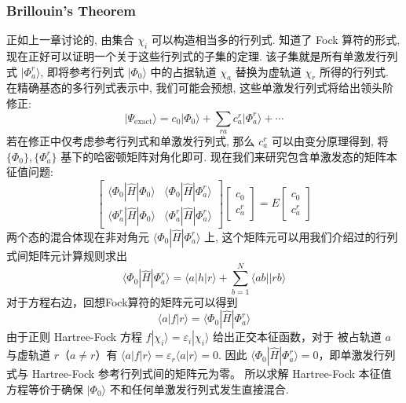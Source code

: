 \documentclass[fontset=none,12pt,a4paper]{ctexart}
\numberwithin{equation}{section}
\begin{document}
\subsubsection{Brillouin's Theorem}
正如上一章讨论的, 由集合 ${\chi_i}$ 可以构造相当多的行列式. 知道了 Fock 算符的形式,
现在正好可以证明一个关于这些行列式的子集的定理. 该子集就是所有单激发行列式
$|\Phi_a^r\rangle$, 即将参考行列式 $|\Phi_0\rangle$ 中的占据轨道 $\chi_a$
替换为虚轨道 $\chi_r$ 所得的行列式. 在精确基态的多行列式表示中, 我们可能会预想,
这些单激发行列式将给出领头阶修正:
\begin{equation}
  |\Psi_{\mathrm{exact}}\rangle
  =c_0|\Phi_0\rangle+\sum_{ra}c_a^r|\Phi_a^r\rangle+\cdots
\end{equation}
若在修正中仅考虑参考行列式和单激发行列式, 那么 $c_a^r$ 可以由变分原理得到,
将 $\{\Phi_0\}, \{\Phi_a^r\}$ 基下的哈密顿矩阵对角化即可. 现在我们来研究包含单激发态的矩阵本征值问题:
\begin{equation}
  \begin{bmatrix}
    \langle\Phi_0|\hat{H}|\Phi_0\rangle & \langle\Phi_0|\hat{H}|\Phi_a^r\rangle \\
    \langle\Phi_a^r|\hat{H}|\Phi_0\rangle & \langle\Phi_a^r|\hat{H}|\Phi_a^r\rangle
  \end{bmatrix}  \begin{bmatrix}
    c_0 \\ c_a^r
  \end{bmatrix}
  =E
  \begin{bmatrix}
    c_0 \\ c_a^r
  \end{bmatrix}
  \label{eq:smatrix}
\end{equation}
两个态的混合体现在非对角元 $\langle\Phi_0|\hat{H}|\Phi_a^r\rangle$ 上, 这个矩阵元可以用我们介绍过的行列式间矩阵元计算规则求出
\begin{equation}
  \langle\Phi_0|\hat{H}|\Phi_a^r\rangle
  =\langle a|h|r\rangle+\sum_{b=1}^N\langle ab||rb\rangle
\end{equation}
对于方程右边，回想Fock算符的矩阵元可以得到
\begin{equation}
  \langle a|f|r\rangle=\langle\Phi_0|\hat{H}|\Phi_a^r\rangle
\end{equation}
由于正则 Hartree-Fock 方程 $f|\chi_i\rangle=\varepsilon_i|\chi_i\rangle$ 给出正交本征函数，对于
被占轨道 $a$ 与虚轨道 $r$（$a\neq r$）有 $\langle a|f|r\rangle = \varepsilon_r\langle a|r\rangle = 0$.
因此 $\langle\Phi_0|\hat{H}|\Phi_a^r\rangle = 0$，即单激发行列式与 Hartree-Fock 参考行列式间的矩阵元为零。
所以求解 Hartree-Fock 本征值方程等价于确保 $|\Phi_0\rangle$ 不和任何单激发行列式发生直接混合.
\end{document}
